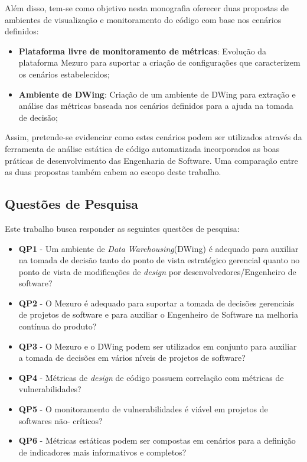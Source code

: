 %

Além disso, tem-se como objetivo nesta monografia oferecer duas propostas de ambientes de visualização e monitoramento do código com base nos cenários definidos:
\begin{itemize}
\item \textbf{Plataforma livre de monitoramento de métricas}: Evolução da plataforma Mezuro para suportar a criação de configurações que caracterizem os cenários estabelecidos;
\item \textbf{Ambiente de DWing}: Criação de um ambiente de DWing para extração e análise das métricas baseada nos cenários definidos para a ajuda na tomada de decisão;
\end{itemize}

Assim, pretende-se evidenciar como estes cenários podem ser utilizados através da ferramenta de análise estática de código automatizada incorporados as boas práticas de desenvolvimento das Engenharia de Software. Uma comparação entre as duas propostas também cabem ao escopo deste trabalho.

%

\subsection{Questões de Pesquisa}

%

Este trabalho busca responder as seguintes questões de pesquisa:

%

\begin{itemize}
\item \textbf{QP1} - Um ambiente de \emph{Data Warehousing}(DWing) é  adequado para auxiliar na tomada de decisão tanto do ponto de vista estratégico gerencial quanto no ponto de vista de modificações de \emph{design} por desenvolvedores/Engenheiro de software?
\item \textbf{QP2} - O Mezuro é adequado para suportar a tomada de decisões gerenciais de projetos de software e para auxiliar o Engenheiro de Software na melhoria contínua do produto?
\item \textbf{QP3} - O Mezuro e o DWing podem ser utilizados em conjunto para auxiliar a tomada de decisões em vários níveis de projetos de software?
\item \textbf{QP4} - Métricas de \emph{design} de código possuem correlação com métricas de vulnerabilidades?
\item \textbf{QP5} - O monitoramento de vulnerabilidades é viável em projetos de softwares não- críticos?
\item \textbf{QP6} - Métricas estáticas podem ser compostas em cenários para a definição de indicadores mais informativos e completos?
\end{itemize}

